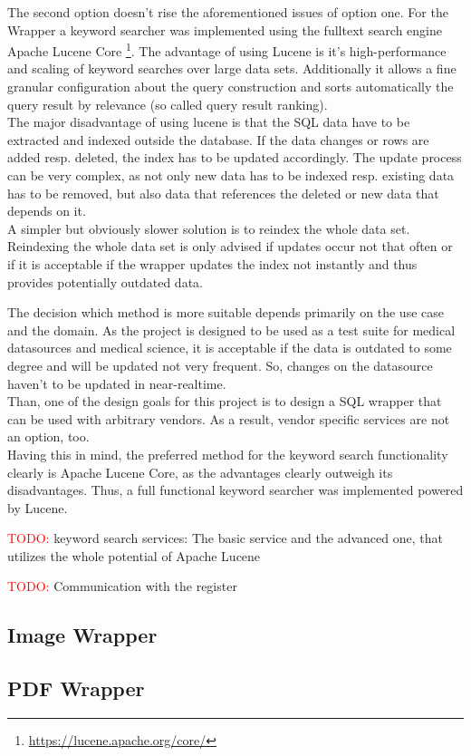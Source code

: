 The second option doesn't rise the aforementioned issues of option one. For the Wrapper a keyword searcher was implemented using the fulltext search engine Apache Lucene Core \footnote{\url{https://lucene.apache.org/core/}}. The advantage of using Lucene is it's high-performance and scaling of keyword searches over large data sets. Additionally it allows a fine granular configuration about the query construction and sorts automatically the query result by relevance (so called query result ranking). \\
The major disadvantage of using lucene is that the SQL data have to be extracted and indexed outside the database. If the data changes or rows are added resp. deleted, the index has to be updated accordingly. The update process can be very complex, as not only new data has to be indexed resp. existing data has to be removed, but also data that references the deleted or new data that depends on it.\\
A simpler but obviously slower solution is to reindex the whole data set. Reindexing the whole data set is only advised if updates occur not that often or if it is acceptable if the wrapper updates the index not instantly and thus provides potentially outdated data.

The decision which method is more suitable depends primarily on the use case and the domain. As the project is designed to be used as a test suite for medical datasources and medical science, it is acceptable if the data is outdated to some degree and will be updated not very frequent. So, changes on the datasource haven't to be updated in near-realtime. \\
Than, one of the design goals for this project is to design a SQL wrapper that can be used with arbitrary vendors. As a result, vendor specific services are not an option, too.\\
Having this in mind, the preferred method for the keyword search functionality clearly is Apache Lucene Core, as the  advantages clearly outweigh its disadvantages. Thus, a full functional keyword searcher was implemented powered by Lucene.


\textcolor{red}{TODO:} keyword search services: The basic service and the advanced one, that utilizes the whole potential of Apache Lucene

\textcolor{red}{TODO:} Communication with the register

\subsection{Image Wrapper}
\subsection{PDF Wrapper}
